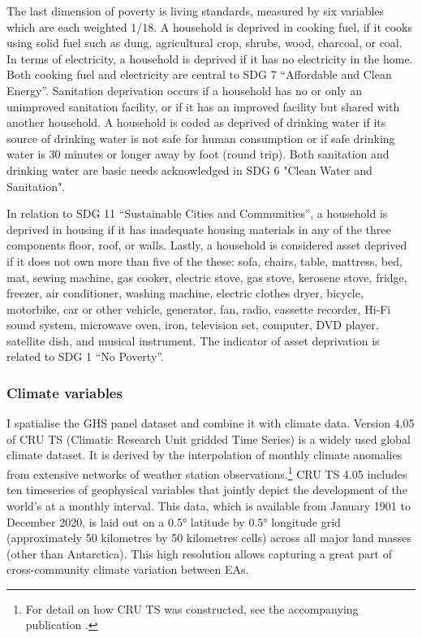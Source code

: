 \documentclass[a4paper,12pt]{article}
\theoremstyle{plain}
\theoremstyle{definition}
\theoremstyle{definition}
\theoremstyle{definition}
\theoremstyle{definition}
\begin{document}
The last dimension of poverty is living standards, measured by six variables which are each weighted 1/18. A household is deprived in cooking fuel, if it cooks using solid fuel such as dung, agricultural crop, shrubs, wood, charcoal, or coal. In terms of electricity, a household is deprived if it has no electricity in the home. Both cooking fuel and electricity are central to SDG 7 ``Affordable and Clean Energy''. Sanitation deprivation occurs if a household has no or only an unimproved sanitation facility, or if it has an improved facility but shared with another household. A household is coded as deprived of drinking water if its source of drinking water is not safe for human consumption or if safe drinking water is 30 minutes or longer away by foot (round trip). Both sanitation and drinking water are basic needs acknowledged in SDG 6 "Clean Water and Sanitation".

In relation to SDG 11 ``Sustainable Cities and Communities'', a household is deprived in housing if it has inadequate housing materials in any of the three components floor, roof, or walls. Lastly, a household is considered asset deprived if it does not own more than five of the these: sofa, chairs, table, mattress, bed, mat, sewing machine, gas cooker, electric stove, gas stove, kerosene stove, fridge, freezer, air conditioner, washing machine, electric clothes dryer, bicycle, motorbike, car or other vehicle, generator, fan, radio, cassette recorder, Hi-Fi sound system, microwave oven, iron, television set, computer, DVD player, satellite dish, and musical instrument. The indicator of asset deprivation is related to SDG 1 ``No Poverty''.

\subsubsection{Climate variables}
\label{subsub:climatevars}

I spatialise the GHS panel dataset and combine it with climate data. Version 4.05 of CRU TS (Climatic Research Unit gridded Time Series) is a widely used global climate dataset. It is derived by the interpolation of monthly climate anomalies from extensive networks of weather station observations.\footnote{For detail on how CRU TS was constructed, see the accompanying publication \citep{harris2020}.} CRU TS 4.05 includes ten timeseries of geophysical variables that jointly depict the development of the world's at a monthly interval. This data, which is available from January 1901 to December 2020, is laid out on a 0.5° latitude by 0.5° longitude grid (approximately 50 kilometres by 50 kilometres cells) across all major land masses (other than Antarctica). This high resolution allows capturing a great part of cross-community climate variation between EAs.
\end{document}
